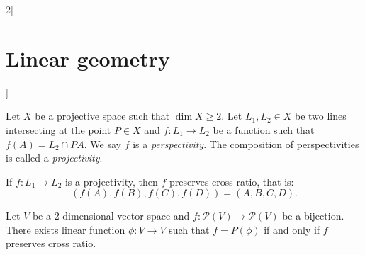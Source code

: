 \documentclass[../../../main.tex]{subfiles}
\begin{document}
\begin{multicols}{2}[\section{Linear geometry}]
\begin{definition}
        Let $X$ be a projective space such that $\dim X\geq 2$. Let $L_1,L_2\in X$ be two lines intersecting at the point $P\in X$ and $f:L_1\rightarrow L_2$ be a function such that $f(A)=L_2\cap PA$. We say $f$ is a \textit{perspectivity}. The composition of perspectivities is called a \textit{projectivity}.
    \end{definition}
    \begin{theorem}
        If $f:L_1\rightarrow L_2$ is a projectivity, then $f$ preserves cross ratio, that is: $$(f(A),f(B),f(C),f(D))=(A,B,C,D).$$
    \end{theorem}
    \begin{theorem}
        Let $V$ be a 2-dimensional vector space and $f:\mathcal{P}(V)\rightarrow \mathcal{P}(V)$ be a bijection. There exists linear function $\phi:V\rightarrow V$ such that $f=P(\phi)$ if and only if $f$ preserves cross ratio.
    \end{theorem}

\end{multicols}
\end{document}

